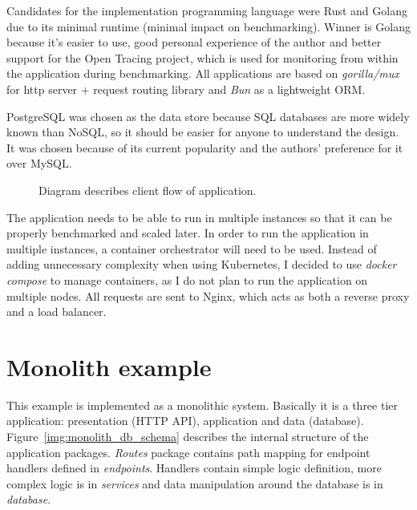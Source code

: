 Candidates for the implementation programming language were Rust and Golang due to its minimal runtime (minimal impact on benchmarking). Winner is Golang because it's easier to use, good personal experience of the author and better support for the Open Tracing project, which is used for monitoring from within the application during benchmarking. All applications are based on \textit{gorilla/mux} \cite{MUX} for http server + request routing library and \textit{Bun} \cite{BUN} as a lightweight ORM.

PostgreSQL was chosen as the data store because SQL databases are more widely known than NoSQL, so it should be easier for anyone to understand the design. It was chosen because of its current popularity and the authors' preference for it over MySQL.
\begin{figure}
    \centering
    
    \caption{Diagram describes client flow of application. \label{img:app_activity_flow}}
\end{figure}

The application needs to be able to run in multiple instances so that it can be properly benchmarked and scaled later. In order to run the application in multiple instances, a container orchestrator will need to be used. Instead of adding unnecessary complexity when using Kubernetes, I decided to use \textit{docker compose} to manage containers, as I do not plan to run the application on multiple nodes. All requests are sent to Nginx, which acts as both a reverse proxy and a load balancer.


\section{Monolith example}
This example is implemented as a monolithic system. Basically it is a three tier application: presentation (HTTP API), application and data (database). Figure~\ref{img:monolith_db_schema} describes the internal structure of the application packages. \textit{Routes} package contains path mapping for endpoint handlers defined in \textit{endpoints}. Handlers contain simple logic definition, more complex logic is in \textit{services} and data manipulation around the database is in \textit{database}.

%     


